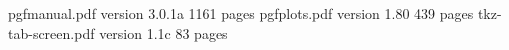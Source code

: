 \newpage

\begin{thebibliography}{99}
 pgfmanual.pdf  	\hspace{1cm}	version 3.0.1a \hspace{1cm} 	1161 pages 	\hspace{1cm}	\DGB
{} pgfplots.pdf 	\hspace{1cm}	version 1.80 \hspace{1cm} 	439 pages 	\hspace{1cm}	\DGB
{} tkz-tab-screen.pdf 	\hspace{1cm}	version 1.1c \hspace{1cm} 	83 pages 	\hspace{1cm}	\DFR

\end{thebibliography}